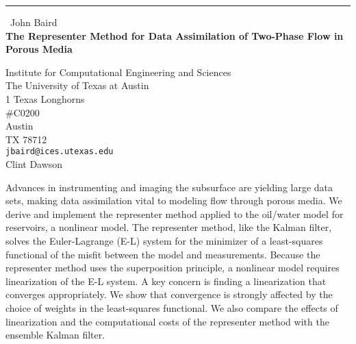 \documentclass{report}
\begin{document}
\begin{center}
\rule{6in}{1pt} \
{\large John Baird \\
{\bf The Representer Method for Data Assimilation of Two-Phase Flow in Porous Media}}

Institute for Computational Engineering and Sciences \\ The University of Texas at Austin \\ 1 Texas Longhorns \\ #C0200 \\ Austin \\ TX 78712
\\
{\tt jbaird@ices.utexas.edu}\\
Clint Dawson\end{center}

Advances in instrumenting and imaging the subsurface are yielding large
data sets, making data assimilation vital to modeling flow through porous
media. We derive and implement the representer method applied to the
oil/water model for reservoirs, a nonlinear model. The representer
method, like the Kalman filter, solves the Euler-Lagrange (E-L) system
for the minimizer of a least-squares functional of the misfit between the
model and measurements. Because the representer method uses the
superposition principle, a nonlinear model requires linearization of the
E-L system. A key concern is finding a linearization that converges
appropriately. We show that convergence is strongly affected by the
choice of weights in the least-squares functional. We also compare the
effects of linearization and the computational costs of the representer
method with the ensemble Kalman filter.
\end{document}
